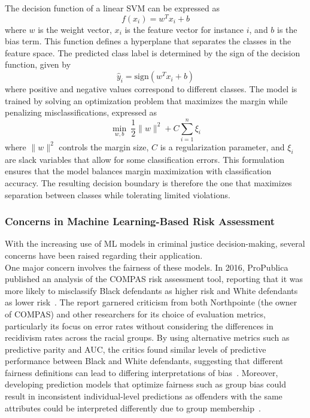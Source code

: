 \documentclass[12pt]{article}
\begin{document}
\begin{enumerate}
  The decision function of a linear SVM can be expressed as \[ f(x_i) = w^T x_i + b \] where $ w $ is the weight vector, $ x_i $ is the feature vector for instance $i$, and $b$ is the bias term. This function defines a hyperplane that separates the classes in the feature space. The predicted class label is determined by the sign of the decision function, given by \[ \hat{y}_i = \text{sign}(w^T x_i + b) \] where positive and negative values correspond to different classes. The model is trained by solving an optimization problem that maximizes the margin while penalizing misclassifications, expressed as \[ \min_{w,b} \ \frac{1}{2} \|w\|^2 + C \sum_{i=1}^{n} \xi_i \] where $ \|w\|^2 $ controls the margin size, $ C $ is a regularization parameter, and $ \xi_i $ are slack variables that allow for some classification errors. This formulation ensures that the model balances margin maximization with classification accuracy. The resulting decision boundary is therefore the one that maximizes separation between classes while tolerating limited violations.
\end{enumerate}

\subsubsection{Concerns in Machine Learning-Based Risk Assessment}
\tab With the increasing use of ML models in criminal justice decision-making, several concerns have been raised regarding their application.\\

One major concern involves the fairness of these models. In 2016, ProPublica published an analysis of the COMPAS risk assessment tool, reporting that it was more likely to misclassify Black defendants as higher risk and White defendants as lower risk~\cite{propublica2016analysis}. The report garnered criticism from both Northpointe (the owner of COMPAS) and other researchers for its choice of evaluation metrics, particularly its focus on error rates without considering the differences in recidivism rates across the racial groups. By using alternative metrics such as predictive parity and AUC, the critics found similar levels of predictive performance between Black and White defendants, suggesting that different fairness definitions can lead to differing interpretations of bias~\cite{dieterich2016compas, corbett2017algorithmic, flores2016false}. Moreover, developing prediction models that optimize fairness such as group bias could result in inconsistent individual-level predictions as offenders with the same attributes could be interpreted differently due to group membership~\cite{greene2022forks, corbett2017algorithmic}.
\end{document}
